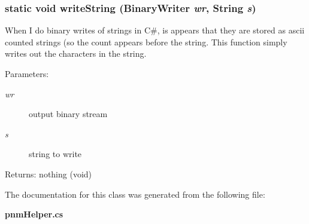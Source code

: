 \subsubsection{\setlength{\rightskip}{0pt plus 5cm}static void write\-String (Binary\-Writer {\em wr}, String {\em s})\hspace{0.3cm}{\tt  [static, private]}}\label{class_c_s_image_viewer_1_1pnm_helper_c2861a988c1bc2b0fabc9d21f0e71167}


When I do binary writes of strings in C\#, is appears that they are stored as ascii counted strings (so the count appears before the string. This function simply writes out the characters in the string. 

\begin{Desc}
\item[Parameters:]
\begin{description}
\item[{\em wr}]output binary stream \item[{\em s}]string to write\end{description}
\end{Desc}
\begin{Desc}
\item[Returns:]nothing (void) \end{Desc}


The documentation for this class was generated from the following file:\begin{CompactItemize}
\item 
{\bf pnm\-Helper.cs}\end{CompactItemize}
